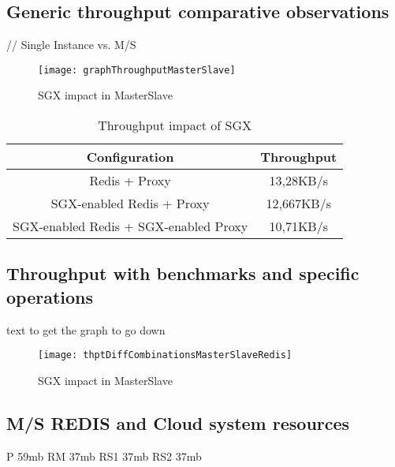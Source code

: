 \subsection{Generic throughput comparative observations}
// Single Instance vs. M/S

\begin{figure}[htbp]
	\centering
	{\texttt{[image: graphThroughputMasterSlave]}}
	\caption{SGX impact in MasterSlave}
	\label{fig:graphTroughputMasterSlave}
\end{figure}

\begin{table}[ht]
	\caption{Throughput impact of SGX} %
	\centering %
	\begin{tabular}{c c} %
		\hline\hline %
		\textbf{Configuration} & \textbf{Throughput} \\ [0.5ex] %
		\hline
		Redis + Proxy & 13,28KB/s\\
		\hline
		SGX-enabled Redis + Proxy & 12,667KB/s \\
		\hline %
		SGX-enabled Redis + SGX-enabled Proxy & 10,71KB/s\\ [1ex] %
		\hline %
	\end{tabular}
	\label{table:throughputMasterSlaveRedis} %
\end{table}

\subsection{Throughput with benchmarks and specific operations}

text to get the graph to go down

\begin{figure}[htbp]
	\centering
	{\texttt{[image: thptDiffCombinationsMasterSlaveRedis]}}
	\caption{SGX impact in MasterSlave}
	\label{fig:thptDiffCombinationsMasterSlaveRedis}
\end{figure}

\subsection{M/S REDIS and Cloud system resources}

P 59mb	RM 37mb	 RS1 37mb  RS2 37mb

